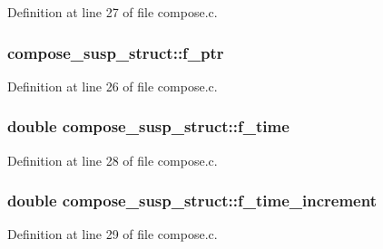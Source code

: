 Definition at line 27 of file compose.\+c.

\subsubsection[{\texorpdfstring{f\+\_\+ptr}{f_ptr}}]{ compose\+\_\+susp\+\_\+struct\+::f\+\_\+ptr}\hypertarget{structcompose__susp__struct_a57d3f35fec97705986d1da6b88003bea}{}\label{structcompose__susp__struct_a57d3f35fec97705986d1da6b88003bea}


Definition at line 26 of file compose.\+c.

\subsubsection[{\texorpdfstring{f\+\_\+time}{f_time}}]{\setlength{\rightskip}{0pt plus 5cm}double compose\+\_\+susp\+\_\+struct\+::f\+\_\+time}\hypertarget{structcompose__susp__struct_a985ec562e0a1a49278607bd0af96343a}{}\label{structcompose__susp__struct_a985ec562e0a1a49278607bd0af96343a}


Definition at line 28 of file compose.\+c.

\subsubsection[{\texorpdfstring{f\+\_\+time\+\_\+increment}{f_time_increment}}]{\setlength{\rightskip}{0pt plus 5cm}double compose\+\_\+susp\+\_\+struct\+::f\+\_\+time\+\_\+increment}\hypertarget{structcompose__susp__struct_a927d8e9cad44c0b07965ea81ef93f374}{}\label{structcompose__susp__struct_a927d8e9cad44c0b07965ea81ef93f374}


Definition at line 29 of file compose.\+c.


